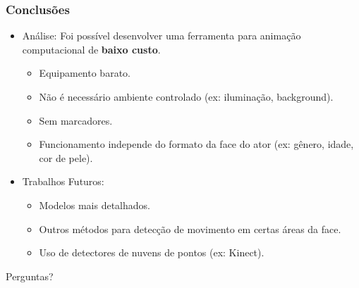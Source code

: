 \documentclass[brazil]{beamer}
\begin{document}
\begin{frame}
\frametitle{Conclusões}
  \begin{itemize}
      \item Análise:
      Foi possível desenvolver uma ferramenta para animação computacional de \textbf{baixo custo}.
      \begin{itemize}
         \item Equipamento barato.
     	 \item Não é necessário ambiente controlado (ex: iluminação, background).
     	 \item Sem marcadores.
     	 \item Funcionamento independe do formato da face do ator (ex: gênero, idade, cor de pele).              
  	  \end{itemize} 
      
      \item Trabalhos Futuros:
      \begin{itemize}
         \item Modelos mais detalhados.
     	 \item Outros métodos para detecção de movimento em certas áreas da face.
     	 \item Uso de detectores de nuvens de pontos (ex: Kinect).           
  	  \end{itemize} 
              
  \end{itemize} 
\end{frame}


\begin{frame}

  Perguntas?
              
\end{frame}
\end{document}
